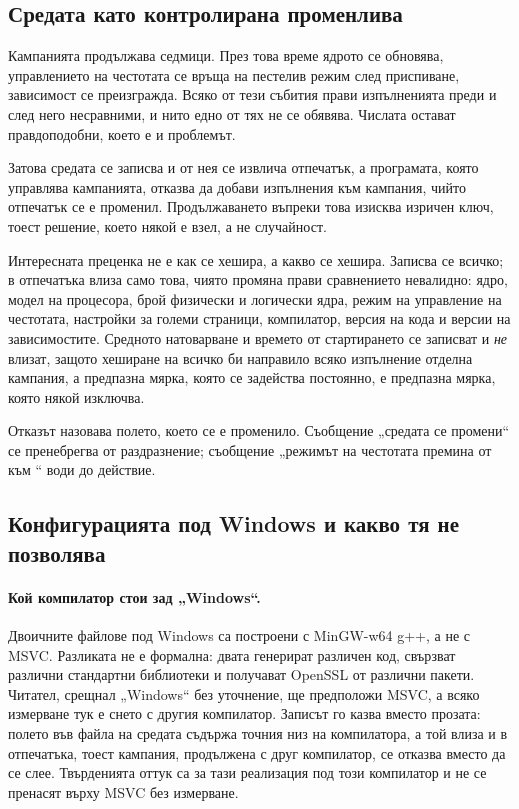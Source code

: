 \subsection{Средата като контролирана променлива}

Кампанията продължава седмици. През това време ядрото се обновява, управлението на честотата
се връща на пестелив режим след приспиване, зависимост се преизгражда. Всяко от тези
събития прави изпълненията преди и след него несравними, и нито едно от тях не се обявява.
Числата остават правдоподобни, което е и проблемът.

Затова средата се записва и от нея се извлича отпечатък, а програмата, която управлява
кампанията, отказва да добави изпълнения към кампания, чийто отпечатък се е променил.
Продължаването въпреки това изисква изричен ключ, тоест решение, което някой е взел, а не
случайност.

Интересната преценка не е как се хешира, а какво се хешира. Записва се всичко; в отпечатъка
влиза само това, чиято промяна прави сравнението невалидно: ядро, модел на процесора, брой
физически и логически ядра, режим на управление на честотата, настройки за големи страници,
компилатор, версия на кода и версии на зависимостите. Средното натоварване и времето от
стартирането се записват и \emph{не} влизат, защото хеширане на всичко би направило всяко
изпълнение отделна кампания, а предпазна мярка, която се задейства постоянно, е предпазна
мярка, която някой изключва.

Отказът назовава полето, което се е променило. Съобщение „средата се промени“ се
пренебрегва от раздразнение; съобщение „режимът на честотата премина от 
към “ води до действие.

\subsection{Конфигурацията под Windows и какво тя не позволява}

\paragraph{Кой компилатор стои зад „Windows“.} Двоичните файлове под Windows са построени с
MinGW-w64 g++, а не с MSVC. Разликата не е формална: двата генерират различен код, свързват
различни стандартни библиотеки и получават OpenSSL от различни пакети. Читател, срещнал
„Windows“ без уточнение, ще предположи MSVC, а всяко измерване тук е снето с другия
компилатор. Записът го казва вместо прозата: полето  във файла на
средата съдържа точния низ на компилатора, а той влиза и в отпечатъка, тоест кампания,
продължена с друг компилатор, се отказва вместо да се слее. Твърденията оттук са за тази
реализация под този компилатор и не се пренасят върху MSVC без измерване.

